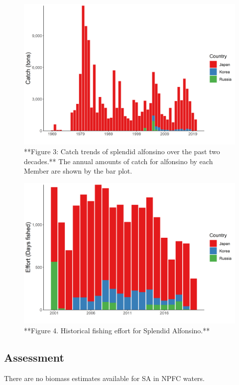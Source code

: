 \documentclass[
]{article}
\begin{document}
\begin{figure}

{\centering \includegraphics[width=0.8\linewidth,height=0.8\textheight]{Figures/SA_Catch} 

}

\caption{**Figure 3: Catch trends of splendid alfonsino over the past two decades.** The annual amounts of catch for alfonsino by each Member are shown by the bar plot.}\label{fig:picture3}
\end{figure}

\begin{figure}

{\centering \includegraphics[width=0.7\linewidth,height=0.7\textheight]{Figures/SA_Effort} 

}

\caption{**Figure 4. Historical fishing effort for Splendid Alfonsino.**}\label{fig:picture1}
\end{figure}

\hypertarget{assessment}{%
\subsection{Assessment}\label{assessment}}

There are no biomass estimates available for SA in NPFC waters.
\end{document}
